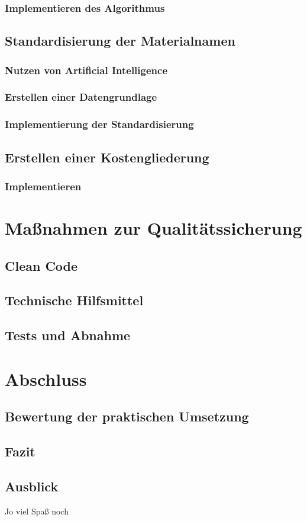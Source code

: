 \subsubsection{Implementieren des Algorithmus}

\subsection{Standardisierung der Materialnamen}
\subsubsection{Nutzen von Artificial Intelligence}

\subsubsection{Erstellen einer Datengrundlage}
\subsubsection{Implementierung der Standardisierung}

\subsection{Erstellen einer Kostengliederung}
\subsubsection{Implementieren}

\section{Maßnahmen zur Qualitätssicherung}
\label{s:qs}
\subsection{Clean Code}
\label{s:qs:cleancode}
\subsection{Technische Hilfsmittel}
\label{s:qs:technical_aids}
\subsection{Tests und Abnahme}
\label{s:qs:tests}
\section{Abschluss}
\label{s:closing}
\subsection{Bewertung der praktischen Umsetzung}
\label{s:closing:rating}
\subsection{Fazit}
\label{s:closing:conclusion}
\subsection{Ausblick}
\label{s:closing:outlook}
 Jo viel Spaß noch
